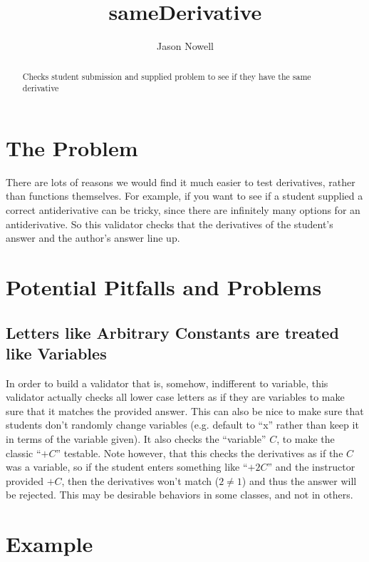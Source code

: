 \documentclass{ximera}
\title{sameDerivative}
\author{Jason Nowell}
\begin{document}
\begin{abstract}
    Checks student submission and supplied problem to see if they have the same derivative
\end{abstract}
\maketitle


\section{The Problem}

    There are lots of reasons we would find it much easier to test derivatives, rather than functions themselves. For example, if you want to see if a student supplied a correct antiderivative can be tricky, since there are infinitely many options for an antiderivative. So this validator checks that the derivatives of the student's answer and the author's answer line up.

\section{Potential Pitfalls and Problems}
    
    \subsection{Letters like Arbitrary Constants are treated like Variables}
        In order to build a validator that is, somehow, indifferent to variable, this validator actually checks all lower case letters as if they are variables to make sure that it matches the provided answer. This can also be nice to make sure that students don't randomly change variables (e.g. default to ``x'' rather than keep it in terms of the variable given). It also checks the ``variable'' $C$, to make the classic ``$+C$'' testable. Note however, that this checks the derivatives as if the $C$ was a variable, so if the student enters something like ``$+2C$'' and the instructor provided $+C$, then the derivatives won't match ($2\neq 1$) and thus the answer will be rejected. This may be desirable behaviors in some classes, and not in others.


\section{Example}
\end{document}
